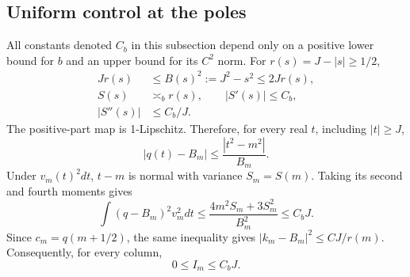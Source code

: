 \documentclass[aps,pra,reprint,superscriptaddress,longbibliography]{revtex4-2}
\theoremstyle{remark}
\begin{document}
\subsection{Uniform control at the poles}

All constants denoted $C_b$ in this subsection depend only on a
positive lower bound for $b$ and an upper bound for its $C^2$ norm.
For $r(s)=J-|s|\geq1/2$,
\begin{equation}
\begin{aligned}
Jr(s)&\leq B(s)^2:=J^2-s^2\leq2Jr(s),\\
S(s)&\asymp_b r(s),\qquad |S'(s)|\leq C_b,\\
|S''(s)|&\leq C_b/J.
\end{aligned}
\label{eq:pole-scales}
\end{equation}
The positive-part map is 1-Lipschitz. Therefore, for every real $t$,
including $|t|\geq J$,
\begin{equation}
 |q(t)-B_m|\leq\frac{|t^2-m^2|}{B_m}.
 \label{eq:global-q}
\end{equation}
Under $v_m(t)^2dt$, $t-m$ is normal with variance $S_m=S(m)$.
Taking its second and fourth moments gives
\begin{equation}
 \int(q-B_m)^2v_m^2dt
 \leq\frac{4m^2S_m+3S_m^2}{B_m^2}\leq C_bJ.
 \label{eq:position-bound}
\end{equation}
Since $c_m=q(m+1/2)$, the same inequality gives
$|k_m-B_m|^2\leq CJ/r(m)$. Consequently, for every column,
\begin{equation}
 0\leq I_m\leq C_bJ.
 \label{eq:I-bound}
\end{equation}
\end{document}
